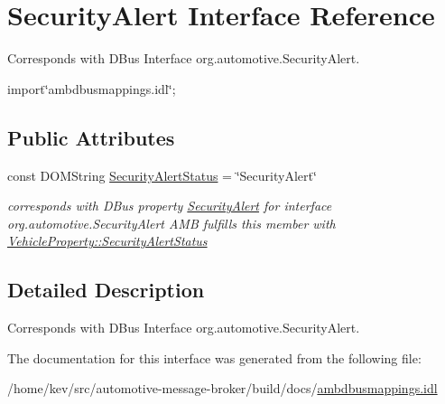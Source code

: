\hypertarget{interfaceSecurityAlert}{\section{Security\+Alert Interface Reference}
\label{interfaceSecurityAlert}
}


Corresponds with D\+Bus Interface org.\+automotive.\+Security\+Alert.  




{\ttfamily import\char`\"{}ambdbusmappings.\+idl\char`\"{};}

\subsection*{Public Attributes}
\begin{DoxyCompactItemize}
\item 
\hypertarget{interfaceSecurityAlert_ab0779cd468893792f8a69126dc27013d}{const D\+O\+M\+String \hyperlink{interfaceSecurityAlert_ab0779cd468893792f8a69126dc27013d}{Security\+Alert\+Status} = \char`\"{}Security\+Alert\char`\"{}}\label{interfaceSecurityAlert_ab0779cd468893792f8a69126dc27013d}

\begin{DoxyCompactList}\small\item\em corresponds with D\+Bus property \hyperlink{interfaceSecurityAlert}{Security\+Alert} for interface org.\+automotive.\+Security\+Alert A\+M\+B fulfills this member with \hyperlink{classVehicleProperty_a7bc28af663879a2ac9145e5b97a5da4f}{Vehicle\+Property\+::\+Security\+Alert\+Status} \end{DoxyCompactList}\end{DoxyCompactItemize}


\subsection{Detailed Description}
Corresponds with D\+Bus Interface org.\+automotive.\+Security\+Alert. 

The documentation for this interface was generated from the following file\+:\begin{DoxyCompactItemize}
\item 
/home/kev/src/automotive-\/message-\/broker/build/docs/\hyperlink{ambdbusmappings_8idl}{ambdbusmappings.\+idl}\end{DoxyCompactItemize}
